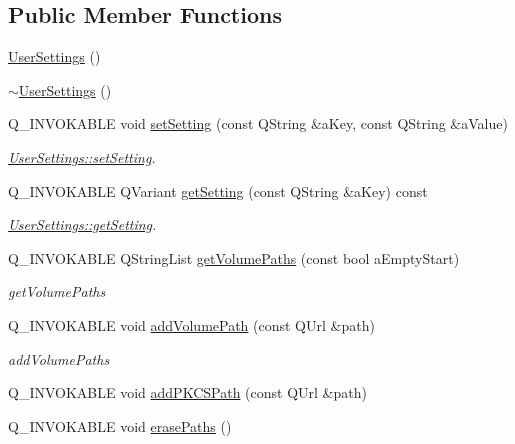 \subsection*{Public Member Functions}
\begin{DoxyCompactItemize}
\item 
\hyperlink{class_user_settings_addb9748b9f0ee298b8e23dee74edfc91}{User\+Settings} ()
\item 
\hyperlink{class_user_settings_abf12285ea58dcf1f4b34f5f68a52b580}{$\sim$\+User\+Settings} ()
\item 
Q\+\_\+\+I\+N\+V\+O\+K\+A\+B\+LE void \hyperlink{class_user_settings_aef31a9f5222e267a9577660105e6b256}{set\+Setting} (const Q\+String \&a\+Key, const Q\+String \&a\+Value)
\begin{DoxyCompactList}\small\item\em \hyperlink{class_user_settings_aef31a9f5222e267a9577660105e6b256}{User\+Settings\+::set\+Setting}. \end{DoxyCompactList}\item 
Q\+\_\+\+I\+N\+V\+O\+K\+A\+B\+LE Q\+Variant \hyperlink{class_user_settings_a527dda1694c70dc98f06cd5f8a0cd38b}{get\+Setting} (const Q\+String \&a\+Key) const
\begin{DoxyCompactList}\small\item\em \hyperlink{class_user_settings_a527dda1694c70dc98f06cd5f8a0cd38b}{User\+Settings\+::get\+Setting}. \end{DoxyCompactList}\item 
Q\+\_\+\+I\+N\+V\+O\+K\+A\+B\+LE Q\+String\+List \hyperlink{class_user_settings_a9d9a36185cb549a4bfd262d489a3d6d6}{get\+Volume\+Paths} (const bool a\+Empty\+Start)
\begin{DoxyCompactList}\small\item\em get\+Volume\+Paths \end{DoxyCompactList}\item 
Q\+\_\+\+I\+N\+V\+O\+K\+A\+B\+LE void \hyperlink{class_user_settings_a69aa858c6028b46a80544712275388bb}{add\+Volume\+Path} (const Q\+Url \&path)
\begin{DoxyCompactList}\small\item\em add\+Volume\+Paths \end{DoxyCompactList}\item 
Q\+\_\+\+I\+N\+V\+O\+K\+A\+B\+LE void \hyperlink{class_user_settings_ab53863f6d8d11cbe8972221237536685}{add\+P\+K\+C\+S\+Path} (const Q\+Url \&path)
\item 
Q\+\_\+\+I\+N\+V\+O\+K\+A\+B\+LE void \hyperlink{class_user_settings_aefa49f195d95789aa6079bd072d0d438}{erase\+Paths} ()

\end{DoxyCompactItemize}
